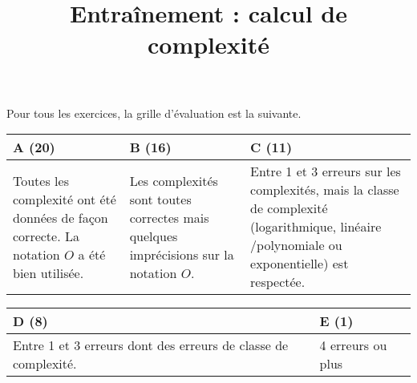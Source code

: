 \documentclass{../cours}
\title{Entraînement : calcul de complexité}
\begin{document}
\maketitle

Pour tous les exercices, la grille d'évaluation est la suivante.

\begin{tabular}{|p{5cm}|p{5cm}|p{5cm}|}
\hline 
A (20) & B (16) & C (11) \\ \hline
\small{Toutes les complexité ont été données de façon correcte. La notation $O$ a été bien utilisée.}
&
\small{Les complexités sont toutes correctes mais quelques imprécisions sur la notation $O$.}
&
\small{Entre 1 et 3 erreurs sur les complexités, mais la classe de complexité (logarithmique, linéaire /polynomiale ou exponentielle) est respectée. }

\\ \hline

\end{tabular}

\begin{tabular}{|p{5cm}|p{5cm}|}
\hline
 D (8) & E (1) \\ \hline
\small{Entre 1 et 3 erreurs dont des erreurs de classe de complexité.}
&
\small{4 erreurs ou plus}
\\ \hline
\end{tabular}




\end{document}
